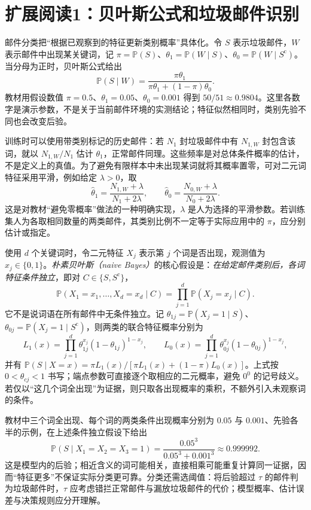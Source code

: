 \section{扩展阅读1：贝叶斯公式和垃圾邮件识别}
\label{sec:study-bayes-spam}

邮件分类把“根据已观察到的特征更新类别概率”具体化。令 $S$ 表示垃圾邮件，$W$ 表示邮件中出现某关键词，记 $\pi=\mathbb P(S)$、$\theta_1=\mathbb P(W\mid S)$、$\theta_0=\mathbb P(W\mid S^{\mathrm c})$。当分母为正时，贝叶斯公式给出
\begin{equation}
 \mathbb P(S\mid W)
 =\frac{\pi\theta_1}{\pi\theta_1+(1-\pi)\theta_0}.
 \label{eq:study-spam-single-word}
\end{equation}
教材用假设数值 $\pi=0.5$、$\theta_1=0.05$、$\theta_0=0.001$ 得到 $50/51\approx0.9804$。这里各数字是演示参数，不是关于当前邮件环境的实测结论；特征似然相同时，类别先验不同也会改变后验。

训练时可以使用带类别标记的历史邮件：若 $N_1$ 封垃圾邮件中有 $N_{1,W}$ 封包含该词，就以 $N_{1,W}/N_1$ 估计 $\theta_1$，正常邮件同理。这些频率是对总体条件概率的估计，不是定义上的真值。为了避免有限样本中未出现某词就将其概率置零，可对二元词特征采用平滑，例如给定 $\lambda>0$，取
\[
 \widehat\theta_1=\frac{N_{1,W}+\lambda}{N_1+2\lambda},\qquad
 \widehat\theta_0=\frac{N_{0,W}+\lambda}{N_0+2\lambda}.
\]
这是对教材“避免零概率”做法的一种明确实现，$\lambda$ 是人为选择的平滑参数。若训练集人为各取相同数量的两类邮件，其类别比例不一定等于实际应用中的 $\pi$，应分别估计或指定。

使用 $d$ 个关键词时，令二元特征 $X_j$ 表示第 $j$ 个词是否出现，观测值为 $x_j\in\{0,1\}$。\emph{朴素贝叶斯（naive Bayes）}的核心假设是：\emph{在给定邮件类别后，各词特征条件独立}，即对 $C\in\{S,S^{\mathrm c}\}$，
\begin{equation}
 \mathbb P(X_1=x_1,\ldots,X_d=x_d\mid C)
 =\prod_{j=1}^{d}\mathbb P(X_j=x_j\mid C).
 \label{eq:study-naive-bayes-assumption}
\end{equation}
它不是说词语在所有邮件中无条件独立。记 $\theta_{1j}=\mathbb P(X_j=1\mid S)$、$\theta_{0j}=\mathbb P(X_j=1\mid S^{\mathrm c})$，则两类的联合特征概率分别为
\[
 L_1(x)=\prod_{j=1}^{d}\theta_{1j}^{x_j}(1-\theta_{1j})^{1-x_j},\qquad
 L_0(x)=\prod_{j=1}^{d}\theta_{0j}^{x_j}(1-\theta_{0j})^{1-x_j},
\]
并有 $\mathbb P(S\mid X=x)=\pi L_1(x)/[\pi L_1(x)+(1-\pi)L_0(x)]$。上式按 $0<\theta_{cj}<1$ 书写；端点参数可直接逐个取相应的二元概率，避免 $0^0$ 的记号歧义。若仅以“这几个词全出现”为证据，则只取各出现概率的乘积，不额外引入未观察词的条件。

教材中三个词全出现、每个词的两类条件出现概率分别为 $0.05$ 与 $0.001$、先验各半的示例，在上述条件独立假设下给出
\[
 \mathbb P(S\mid X_1=X_2=X_3=1)
 =\frac{0.05^3}{0.05^3+0.001^3}\approx0.999992.
\]
这是模型内的后验；相近含义的词可能相关，直接相乘可能重复计算同一证据，因而“特征更多”不保证实际分类更可靠。分类还需选阈值：将后验超过 $\tau$ 的邮件判为垃圾邮件时，$\tau$ 应考虑错拦正常邮件与漏放垃圾邮件的代价；模型概率、估计误差与决策规则应分开理解。

